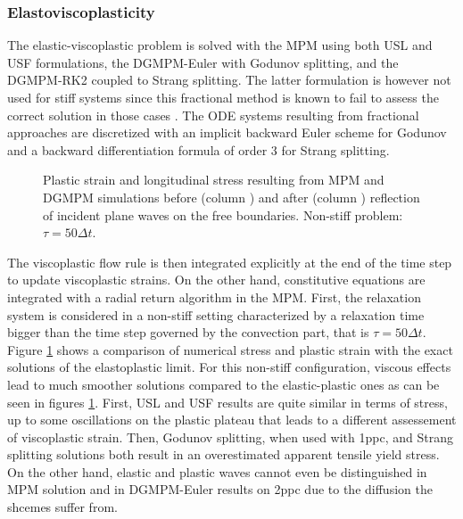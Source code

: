 \subsubsection{Elastoviscoplasticity}
The elastic-viscoplastic problem is solved with the MPM using both USL and USF formulations, the DGMPM-Euler with Godunov splitting, and the DGMPM-RK2 coupled to Strang splitting.
The latter formulation is however not used for stiff systems since this fractional method is known to fail to assess the correct solution in those cases \cite{Thomas_EVP,Leveque_stiff}.
The ODE systems resulting from fractional approaches are discretized with an implicit backward Euler scheme for Godunov and a backward differentiation formula of order 3 for Strang splitting.
\begin{figure}[h!]
  \centering
  { \label{subfig:evp_nonstiff1}}
  { \label{subfig:evp_nonstiff3}}
  {}
  \caption{Plastic strain and longitudinal stress resulting from MPM and DGMPM simulations before (column ) and after (column ) reflection of incident plane waves on the free boundaries. Non-stiff problem: $\tau=50\Delta t$.}
  \label{fig:nonstiff_elastoviscoplastic_RP}
\end{figure}
The viscoplastic flow rule is then integrated explicitly at the end of the time step to update viscoplastic strains.
On the other hand, constitutive equations are integrated with a radial return algorithm \cite{Simo} in the MPM.
First, the relaxation system is considered in a non-stiff setting characterized by a relaxation time bigger than the time step governed by the convection part, that is $\tau=50\Delta t$.
Figure \ref{fig:nonstiff_elastoviscoplastic_RP} shows a comparison of numerical stress and plastic strain with the exact solutions of the elastoplastic limit.
For this non-stiff configuration, viscous effects lead to much smoother solutions compared to the elastic-plastic ones as can be seen in figures \ref{fig:nonstiff_elastoviscoplastic_RP}.
First, USL and USF results are quite similar in terms of stress, up to some oscillations on the plastic plateau that leads to a different assessement of viscoplastic strain. 
Then, Godunov splitting, when used with 1ppc, and Strang splitting solutions both result in an overestimated apparent tensile yield stress. On the other hand, elastic and plastic waves cannot even be distinguished in MPM solution and in DGMPM-Euler results on 2ppc due to the diffusion the shcemes suffer from.
